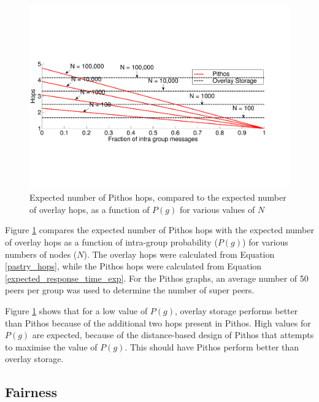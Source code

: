 \documentclass[10pt,a4paper,conference]{IEEEtran}
\begin{document}
\begin{figure}[htbp]
 \centering
 \includegraphics[clip=true, viewport=0cm 5cm 27cm 14.5cm, width=\columnwidth]{Hops_vsGroupFrac_4n}
 \caption{Expected number of Pithos hops, compared to the expected number of overlay hops, as a function of $P(g)$ for various values of $N$}
 \label{fig_hop_compare}
\end{figure}
%
Figure \ref{fig_hop_compare} compares the expected number of Pithos hops with the expected number of overlay hops as a function of intra-group
probability ($P(g)$) for various numbers of nodes ($N$). The overlay hops were calculated from Equation \eqref{pastry_hops}, while the Pithos hops
were calculated from Equation \eqref{expected_response_time_exp}. For the Pithos graphs, an average number of 50 peers per group was used to
determine the number of super peers.

Figure \ref{fig_hop_compare} shows that for a low value of $P(g)$, overlay storage performs better than Pithos because of the additional two hops
present in Pithos. High values for $P(g)$ are expected, because of the distance-based design of Pithos that attempts to maximise the value of $P(g)$.
This should have Pithos perform better than overlay storage.

\subsection{Fairness}
\end{document}
